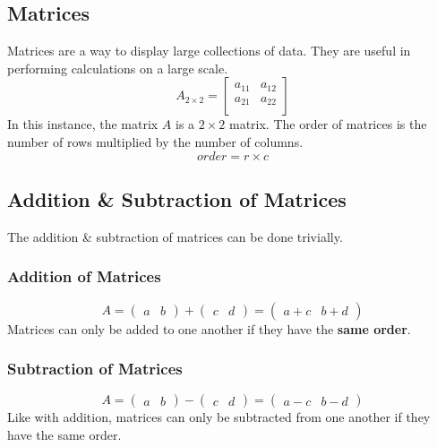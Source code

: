 \documentclass{report}
\begin{document}
\begin{flushleft}
\section{Matrices}
Matrices are a way to display large collections of data. They are useful in performing calculations on a large scale.
\[
  A_{2\times2} =
  \left[ {\begin{array}{cc}
    a_{11} & a_{12} \\
    a_{21} & a_{22} \\
  \end{array} } \right]
\]
In this instance, the matrix $A$ is a $2\times 2$ matrix.  The order of matrices is the number of rows multiplied by the number of columns.
\begin{equation}
	order = r\times c
\end{equation}

\subsection{Addition \& Subtraction of Matrices}
The addition \& subtraction of matrices can be done trivially.
\subsubsection{Addition of Matrices}
\begin{equation}
A=
\begin{pmatrix}
a & b
\end{pmatrix} +
\begin{pmatrix}
c & d
\end{pmatrix} = 
\begin{pmatrix}
a + c & b + d
\end{pmatrix}
\end{equation}
Matrices can only be added to one another if they have the \textbf{same order}.

\subsubsection{Subtraction of Matrices}
\begin{equation}
A=
\begin{pmatrix}
a & b
\end{pmatrix} -
\begin{pmatrix}
c & d
\end{pmatrix} = 
\begin{pmatrix}
a - c & b - d
\end{pmatrix}
\end{equation}
Like with addition, matrices can only be subtracted from one another if they have the same order.


\end{flushleft}
\end{document}
